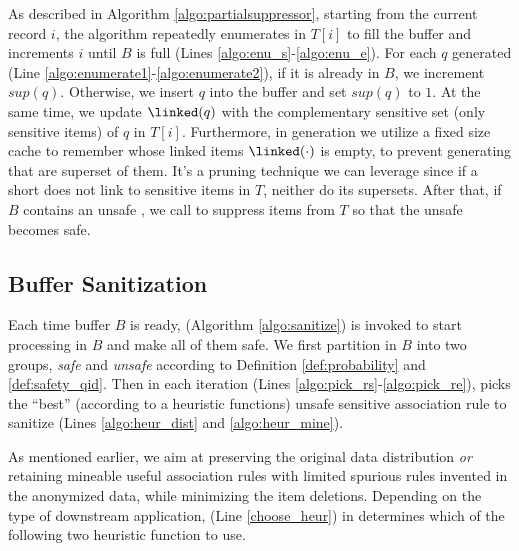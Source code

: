 As described in Algorithm \ref{algo:partialsuppressor}, starting from the
current record $i$, the algorithm repeatedly enumerates \qids in $T[i]$ to
fill the buffer and increments $i$ until $B$ is full (Lines
\ref{algo:enu_s}-\ref{algo:enu_e}).
For each $q$ generated (Line \ref{algo:enumerate1}-\ref{algo:enumerate2}), if
it is already in $B$, we increment $sup(q)$. Otherwise, we insert $q$ into the
buffer and set $sup(q)$ to $1$. At the same time, we update $\linked(q)$ with
the complementary sensitive set (only sensitive items) of $q$ in $T[i]$.
Furthermore, in \qid generation we utilize a fixed size cache to remember \qids
whose linked items $\linked(\cdot)$ is empty, to prevent generating \qids that
are superset of them. It's a pruning technique we can leverage
 since if a short \qid does not link to sensitive items in $T$, neither do its supersets.
After that, if $B$ contains an unsafe \qid, we call \SanitizeBuffer to
suppress items from $T$ so that the unsafe \qid becomes safe.

\subsection{Buffer Sanitization}
\label{sec:sanitize}
Each time \qid buffer $B$ is ready, \SanitizeBuffer
(Algorithm \ref{algo:sanitize}) is invoked to start processing \qids in $B$
and make all of them safe. We first partition \qids in $B$ into two groups,
{\em safe} and {\em unsafe} according to Definition \ref{def:probability} and
\ref{def:safety_qid}.
 Then in each iteration (Lines \ref{algo:pick_rs}-\ref{algo:pick_re}), \SanitizeBuffer
 picks the ``best'' (according to a heuristic functions) unsafe
sensitive association rule %
 to sanitize (Lines \ref{algo:heur_dist} and \ref{algo:heur_mine}).

As mentioned earlier, we aim at preserving the original data distribution
{\em or} retaining mineable useful association rules with limited spurious rules
invented in the anonymized data, while minimizing the item deletions.
Depending on the type of downstream application,
\SuppressionPolicy (Line \ref{choose_heur}) in \SanitizeBuffer determines
which of the following two heuristic function to use.

